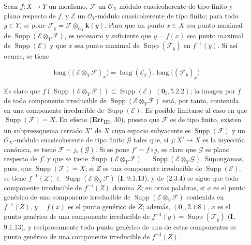 \begin{proposition}[2.5.5]
\label{IV.2.5.5-fr}
Sean $f:X\to Y$ un morfismo, $\mathscr F$ un $\mathcal O_X$-módulo
cuasicoherente de tipo finito y plano respecto de $f$, y $\mathscr E$ un
$\mathcal O_Y$-módulo cuasicoherente de tipo finito; para todo $y\in Y$,
se pone $\mathscr F_y=\mathscr F\otimes_{\mathcal O_Y}\boldsymbol{k}(y)$. Para que un punto
$x\in X$ sea punto maximal de
$\operatorname{Supp}(\mathscr E\otimes_Y\mathscr F)$, es necesario y suficiente
que $y=f(x)$ sea punto maximal de $\operatorname{Supp}(\mathscr E)$ y que $x$
sea punto maximal de $\operatorname{Supp}(\mathscr F_y)$ en $f^{-1}(y)$. Si
así ocurre, se tiene
\end{proposition}

\begin{env}[2.5.5.1]
\label{IV.2.5.5.1-fr}
\[
\operatorname{long}\bigl((\mathscr E\otimes_Y\mathscr F)_x\bigr)
=\operatorname{long}(\mathscr E_y).
 \operatorname{long}\bigl((\mathscr F_y)_x\bigr)
\]
\end{env}

Es claro que
$f(\operatorname{Supp}(\mathscr E\otimes_Y\mathscr F))
\subset\operatorname{Supp}(\mathscr E)$ $(\mathbf{0}_{\mathrm I},5.2.2)$; la imagen por
$f$ de toda componente irreducible de
$\operatorname{Supp}(\mathscr E\otimes_Y\mathscr F)$ está, por tanto, contenida
en una componente irreducible de $\operatorname{Supp}(\mathscr E)$. Es posible
limitarse al caso en que $\operatorname{Supp}(\mathscr F)=X$. En efecto
(\textbf{Err}\textsubscript{III}, 30), puesto que $\mathscr F$ es de
tipo finito, existen un subpreesquema cerrado $X'$ de $X$ cuyo espacio
subyacente es $\operatorname{Supp}(\mathscr F)$ y un $\mathcal O_{X'}$-módulo
cuasicoherente de tipo finito $\mathscr G$ tales que, si $j:X'\to X$ es la
inyección canónica, se tiene $\mathscr F=j_*(\mathscr G)$. Si se pone
$f'=f\circ j$, es claro que $\mathscr G$ es plano respecto de $f'$ y que se
tiene
$\operatorname{Supp}(\mathscr E\otimes_Y\mathscr F)
=\operatorname{Supp}(\mathscr E\otimes_Y\mathscr G)$.
Supongamos, pues, que $\operatorname{Supp}(\mathscr F)=X$; si $Z$ es una
componente irreducible de $\operatorname{Supp}(\mathscr E)$, se tiene
$f^{-1}(Z)\subset\operatorname{Supp}(\mathscr E\otimes_Y\mathscr F)$
(\textbf{I}, 9.1.13),
y de (2.3.4) se sigue que toda componente irreducible de $f^{-1}(Z)$ domina
$Z$; en otras palabras, si $x$ es el punto genérico de una componente
irreducible de $\operatorname{Supp}(\mathscr E\otimes_Y\mathscr F)$ contenida
en $f^{-1}(Z)$, $y=f(x)$ es el punto genérico de $Z$; además,
$(\mathbf{0}_{\mathrm I},2.1.8)$, $x$ es el punto genérico de una componente irreducible
de $f^{-1}(y)=\operatorname{Supp}(\mathscr F_y)$ (\textbf I, 9.1.13), y recíprocamente
todo punto genérico de una de estas componentes es punto genérico de una
componente irreducible de $f^{-1}(Z)$.

